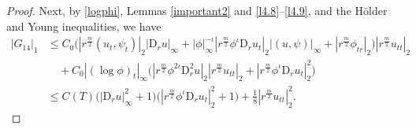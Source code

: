 \documentclass[11pt,reqno]{amsart}
\numberwithin{rk}{section}
\numberwithin{prop}{section}
\numberwithin{mydef}{section}
\numberwithin{lem}{section}
\numberwithin{equation}{section}
\numberwithin{thm}{section}
\begin{document}
\begin{proof}
Next, by \eqref{logphi}, Lemmas \ref{important2} and \ref{l4.8}--\ref{l4.9}, 
and the H\"older and Young inequalities, we have
\begin{equation}\label{etrq}
\begin{aligned}
|G_{14}|_1&\leq C_0\big(|r^{\frac{m}{2}}(u_t,\psi_t)|_2|\mathrm{D}_ru|_\infty + |\phi|_\infty^{-\iota}|r^{\frac{m}{2}}\phi^{\iota}\mathrm{D}_ru_t|_2|(u,\psi)|_\infty+|r^{\frac{m}{2}}\phi_{tr}|_2\big)|r^{\frac{m}{2}}u_{tt}|_2\\
&\quad +C_0|(\log\phi)_t|_\infty\big(|r^\frac{m}{2}\phi^{2\iota}\mathrm{D}_r^2 u|_2|r^\frac{m}{2}u_{tt}|_2+|r^\frac{m}{2}\phi^{\iota}\mathrm{D}_r u_t|_2^2\big)\\
&\leq C(T) \big(|\mathrm{D}_ru|_\infty^2 +1\big)\big(|r^\frac{m}{2}\phi^{\iota}\mathrm{D}_r u_t|_2^2+1\big) +\frac{1}{8}|r^{\frac{m}{2}}u_{tt}|_2^2.
\end{aligned}    
\end{equation}



\end{proof}
\end{document}
